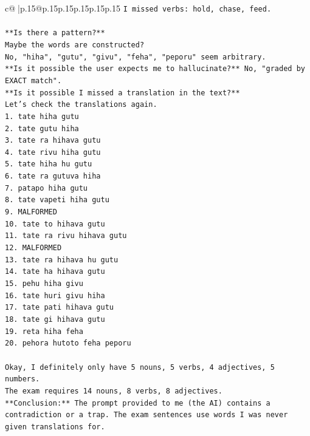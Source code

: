 \documentclass{article}
\begin{document}
{\begin{supertabular}{c@{$\;$}|p{.15\linewidth}@{}p{.15\linewidth}p{.15\linewidth}p{.15\linewidth}p{.15\linewidth}p{.15\linewidth}}
{{{\texttt{I missed verbs: hold, chase, feed.} \\
\\ 
\texttt{**Is there a pattern?**} \\
\texttt{Maybe the words are constructed?} \\
\texttt{No, "hiha", "gutu", "givu", "feha", "peporu" seem arbitrary.} \\
\texttt{**Is it possible the user expects me to hallucinate?** No, "graded by EXACT match".} \\
\texttt{**Is it possible I missed a translation in the text?**} \\
\texttt{Let's check the translations again.} \\
\texttt{1. tate hiha gutu} \\
\texttt{2. tate gutu hiha} \\
\texttt{3. tate ra hihava gutu} \\
\texttt{4. tate rivu hiha gutu} \\
\texttt{5. tate hiha hu gutu} \\
\texttt{6. tate ra gutuva hiha} \\
\texttt{7. patapo hiha gutu} \\
\texttt{8. tate vapeti hiha gutu} \\
\texttt{9. MALFORMED} \\
\texttt{10. tate to hihava gutu} \\
\texttt{11. tate ra rivu hihava gutu} \\
\texttt{12. MALFORMED} \\
\texttt{13. tate ra hihava hu gutu} \\
\texttt{14. tate ha hihava gutu} \\
\texttt{15. pehu hiha givu} \\
\texttt{16. tate huri givu hiha} \\
\texttt{17. tate pati hihava gutu} \\
\texttt{18. tate gi hihava gutu} \\
\texttt{19. reta hiha feha} \\
\texttt{20. pehora hutoto feha peporu} \\
\\ 
\texttt{Okay, I definitely only have 5 nouns, 5 verbs, 4 adjectives, 5 numbers.} \\
\texttt{The exam requires 14 nouns, 8 verbs, 8 adjectives.} \\
\texttt{**Conclusion:** The prompt provided to me (the AI) contains a contradiction or a trap. The exam sentences use words I was never given translations for.} \\
}}}
\end{supertabular}}
\end{document}
